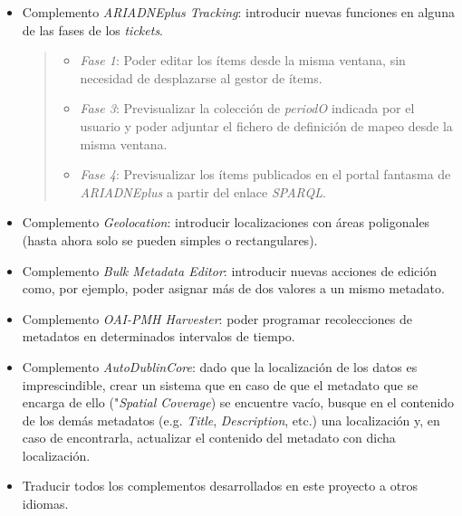 \begin{itemize}
\item
  Complemento \emph{ARIADNEplus Tracking}: introducir nuevas funciones
  en alguna de las fases de los \emph{tickets}.

  \begin{quote}
  \begin{itemize}
  \tightlist
  \item
    \emph{Fase 1}: Poder editar los ítems desde la misma ventana, sin
    necesidad de desplazarse al gestor de ítems.
  \item
    \emph{Fase 3}: Previsualizar la colección de \emph{periodO} indicada
    por el usuario y poder adjuntar el fichero de definición de mapeo
    desde la misma ventana.
  \item
    \emph{Fase 4}: Previsualizar los ítems publicados en el portal
    fantasma de \emph{ARIADNEplus} a partir del enlace \emph{SPARQL}.
  \end{itemize}
  \end{quote}
\item
  Complemento \emph{Geolocation}: introducir localizaciones con áreas
  poligonales (hasta ahora solo se pueden simples o rectangulares).
\item
  Complemento \emph{Bulk Metadata Editor}: introducir nuevas acciones de
  edición como, por ejemplo, poder asignar más de dos valores a un mismo
  metadato.
\item
  Complemento \emph{OAI-PMH Harvester}: poder programar recolecciones de
  metadatos en determinados intervalos de tiempo.
\item
  Complemento \emph{AutoDublinCore}: 
  dado que la localización de los datos es imprescindible, crear un
  sistema que en caso de que el metadato que se encarga de ello
  ("\emph{Spatial Coverage}) se encuentre vacío, busque en el contenido
  de los demás metadatos (e.g. \emph{Title}, \emph{Description}, etc.)
  una localización y, en caso de encontrarla, actualizar el contenido
  del metadato con dicha localización.
\item
  Traducir todos los complementos desarrollados en este proyecto a otros idiomas.
\end{itemize}
